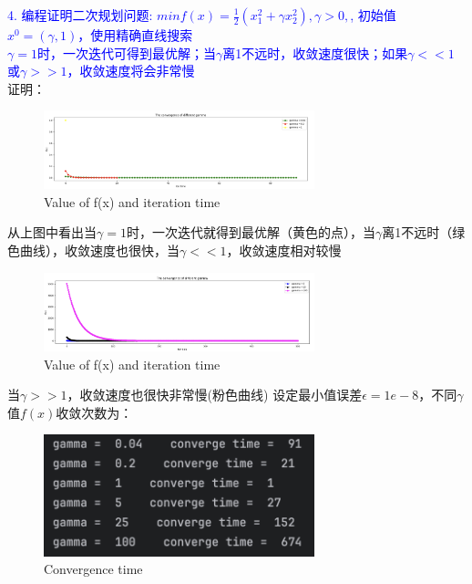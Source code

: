 \documentclass{article}
\begin{document}
\newpage
\textcolor{blue}{4. 编程证明二次规划问题: $min f(x) = \frac{1}{2}(x_1^2 + \gamma x_2^2), \gamma > 0 ,$, 初始值$x^0 = (\gamma,1)$，使用精确直线搜索\\
$\gamma = 1$时，一次迭代可得到最优解；当$\gamma$离1不远时，收敛速度很快；如果$\gamma <<1 $ 或$\gamma >> 1$，收敛速度将会非常慢}\\
证明：
\begin{figure}[H] 
    \centering 
    \includegraphics[width=0.7\textwidth]{quar1.png}
    \caption*{Value of f(x) and iteration time}
\end{figure}
从上图中看出当$\gamma = 1$时，一次迭代就得到最优解（黄色的点），当$\gamma$离1不远时（绿色曲线），收敛速度也很快，当$\gamma <<1 $，收敛速度相对较慢\\
\begin{figure}[H] 
    \centering 
    \includegraphics[width=0.7\textwidth]{quar2.png}
    \caption*{Value of f(x) and iteration time}
\end{figure}
当$\gamma >> 1$，收敛速度也很快非常慢(粉色曲线)
设定最小值误差$\epsilon = 1e-8$，不同$\gamma$值$f(x)$收敛次数为：
\begin{figure}[H] 
    \centering 
    \includegraphics[width=0.7\textwidth]{quar3.png}
    \caption*{Convergence time}
\end{figure}
\end{document}
